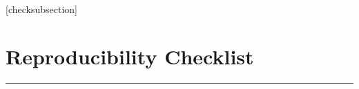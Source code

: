 \documentclass[letterpaper]{article}
\begin{document}
\fi
\setlength{\leftmargini}{20pt}
\makeatletter\def\@listi{\leftmargin\leftmargini \topsep .5em \parsep .5em \itemsep .5em}
\def\@listii{\leftmargin\leftmarginii \labelwidth\leftmarginii \advance\labelwidth-\labelsep \topsep .4em \parsep .4em \itemsep .4em}
\def\@listiii{\leftmargin\leftmarginiii \labelwidth\leftmarginiii \advance\labelwidth-\labelsep \topsep .4em \parsep .4em \itemsep .4em}\makeatother

\setcounter{secnumdepth}{0}
\renewcommand\thesubsection{\arabic{subsection}}
\renewcommand\labelenumi{\thesubsection.\arabic{enumi}}

[checksubsection]

\newcommand{\checksubsection}[1]{%
  \refstepcounter{checksubsection}%
  \paragraph{\arabic{checksubsection}. #1}%
  \setcounter{checkitem}{0}%
}

\newcommand{\checkitem}{%
  \refstepcounter{checkitem}%
  \item[\arabic{checksubsection}.\arabic{checkitem}.]%
}
\newcommand{\question}[2]{\normalcolor\checkitem #1 #2 \color{blue}}
\newcommand{\ifyespoints}[1]{\makebox[0pt][l]{\hspace{-15pt}\normalcolor #1}}

\section*{Reproducibility Checklist}

\vspace{1em}
\hrule
\vspace{1em}


\end{document}
